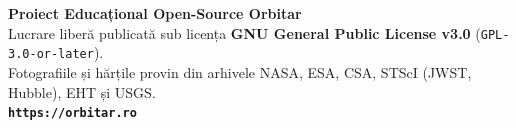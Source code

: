 \documentclass[11pt,a4paper,twoside,openany]{book}
\begin{document}
\vfill

\begin{center}
  {\color{white}\normalsize\bfseries Proiect Educațional Open-Source Orbitar}\\[4pt]
  {\color{white!80}\footnotesize Lucrare liberă publicată sub licența \textbf{GNU General Public License v3.0} (\texttt{GPL-3.0-or-later}).\\
  Fotografiile și hărțile provin din arhivele NASA, ESA, CSA, STScI (JWST, Hubble), EHT și USGS.}\\[6pt]
  {\color{orbitarCyan}\small\bfseries \texttt{https://orbitar.ro}}
\end{center}
\vspace*{0.4cm}
\end{document}
